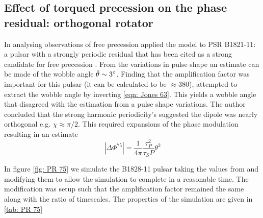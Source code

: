 \documentclass[../full_thesis/full_thesis.tex]{subfiles}
\begin{document}

\subsection{Effect of torqued precession on the phase residual: orthogonal rotator}

In analysing observations of free precession \citet{Jones2001} applied the
model to PSR B1821-11: a pulsar with a strongly periodic residual that has been
cited as a strong candidate for free precession \citet{Stairs2000}. From the
variations in pulse shape an estimate can be made of the wobble angle
$\tilde{\theta} \sim 3^{\circ}$. Finding that the amplification factor was
important for this pulsar (it can be calculated to be $\approx 380$),
\citet{Jones2001} attempted to extract the wobble
angle by inverting \eqref{eqn: Jones 63}. This yields a wobble angle that
disagreed with the estimation from a pulse shape variations. The author
concluded that the strong harmonic periodicity's suggested the dipole was
nearly orthogonal e.g. $\chi \approx \pi/2$.  This required expansions of the
phase modulation resulting in an estimate
\begin{equation}
    |\Delta\Phi^{75}| = \frac{1}{4\pi} \frac{\tau_{P}^{2}}{\tau_{S} P} \theta^{2}
    \label{eqn: Jones 75}
\end{equation}

In figure \ref{fig: PR 75} we simulate the B1828-11 pulsar taking the values
from \citet{Stairs2000} and modifying them to allow the simulation to complete
in a reasonable time. The modification was setup such that the amplification
factor remained the same along with the ratio of timescales. The properties
of the simulation are given in \ref{tab: PR 75}
\end{document}
